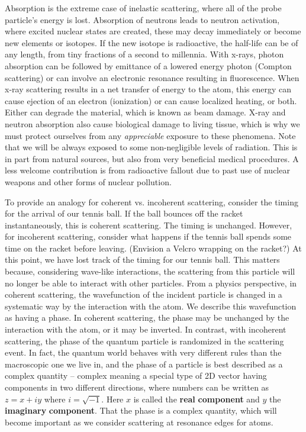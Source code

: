 Absorption is the extreme case of inelastic scattering, where all of the probe particle's energy is lost. Absorption of neutrons leads to neutron activation, where excited nuclear states are created, these may decay immediately or become new elements or isotopes. If the new isotope is radioactive, the half-life can be of any length, from tiny fractions of a second to millennia. With x-rays, photon absorption can be followed by emittance of a lowered energy photon (Compton scattering) or can involve an electronic resonance resulting in fluorescence. When x-ray scattering results in a net transfer of energy to the atom, this energy can cause ejection of an electron (ionization) or can cause localized heating, or both. Either can degrade the material, which is known as beam damage. X-ray and neutron absorption also cause biological damage to living tissue, which is why we must protect ourselves from any \textit{appreciable} exposure to these phenomena. Note that we will be always exposed to some non-negligible levels of radiation. This is in part from natural sources, but also from very beneficial medical procedures. A less welcome contribution is from radioactive fallout due to past use of nuclear weapons and other forms of nuclear pollution.

To provide an analogy for coherent vs. incoherent scattering, consider the timing for the arrival of our tennis ball. If the ball bounces off the racket instantaneously, this is coherent scattering. The timing is unchanged. 
However, for incoherent scattering, consider what happens if the tennis ball spends some time on the racket before leaving.  (Envision a Velcro wrapping on the racket?) At this point, we have lost track of the timing for our tennis ball. This matters because, considering wave-like interactions, the scattering from this particle will no longer be able to interact with other particles. 
From a physics perspective, in coherent scattering, the wavefunction of the incident particle is changed in a systematic way by the interaction with the atom. We describe this wavefunction as having a phase. In coherent scattering, the phase may be unchanged by the interaction with the atom, or it may be inverted. In contrast, with incoherent scattering, the phase of the quantum particle is randomized in the scattering event. 
In fact, the quantum world behaves with very different rules than the macroscopic one we live in, and the phase of a particle is best described as a complex quantity – complex meaning a special type of 2D vector having components in two different directions, where numbers can be written as $z = x + iy$ where $i=\sqrt{-1}$. Here $x$ is called the \textbf{real }\textbf{component} and $y$ the \textbf{imaginary }\textbf{component}. That the phase is a complex quantity, which will become important as we consider scattering at resonance edges for atoms. 

